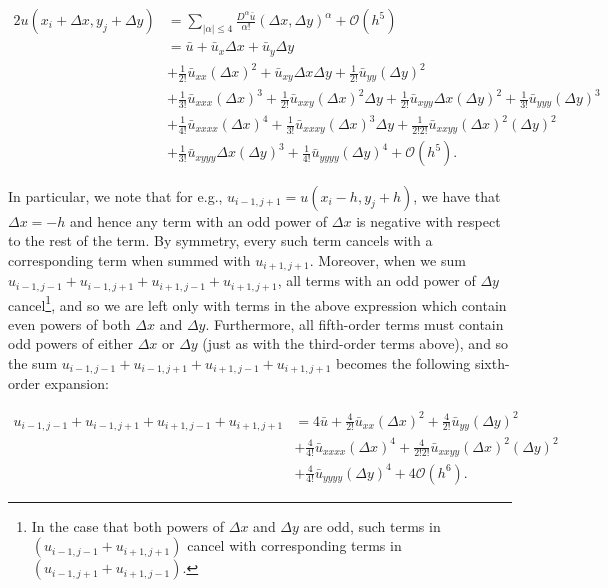 \begin{solution}
   \begin{alignat*}{2}
      u(x_i + \Delta x, y_j + \Delta y) &= \sum\limits_{|\alpha| \le 4}{\frac{D^{\alpha}\bar{u}}{\alpha!} (\Delta x, \Delta y)^\alpha} + \mathcal{O}(h^5) \\
                                        &= \bar{u} + \bar{u}_{x} \Delta x + \bar{u}_{y} \Delta y \\
                                        &+ \frac{1}{2!} \bar{u}_{xx}(\Delta x)^2 + \bar{u}_{xy} \Delta x \Delta y + \frac{1}{2!} \bar{u}_{yy}(\Delta y)^2 \\
                                        &+ \frac{1}{3!} \bar{u}_{xxx}(\Delta x)^3 + \frac{1}{2!} \bar{u}_{xxy} (\Delta x)^2 \Delta y + \frac{1}{2!} \bar{u}_{xyy} \Delta x (\Delta y)^2 + \frac{1}{3!} \bar{u}_{yyy}(\Delta y)^3 \\
                                        &+ \frac{1}{4!} \bar{u}_{xxxx}(\Delta x)^4 + \frac{1}{3!} \bar{u}_{xxxy} (\Delta x)^3 \Delta y + \frac{1}{2! 2!} \bar{u}_{xxyy} (\Delta x)^2 (\Delta y)^2  \\
                                        &+ \frac{1}{3!} \bar{u}_{xyyy} \Delta x (\Delta y)^3 + \frac{1}{4!} \bar{u}_{yyyy}(\Delta y)^4 + \mathcal{O}(h^5).
   \end{alignat*}

   In particular, we note that for e.g., $u_{i-1, j+1} = u(x_i - h, y_j + h)$, we have that $\Delta x = -h$ and hence
   any term with an odd power of $\Delta x$ is negative with respect to the rest of the term. By symmetry, every such 
   term cancels with a corresponding term when summed with $u_{i+1, j+1}$. Moreover, when we sum 
   $u_{i-1, j-1} + u_{i-1, j+1} + u_{i+1, j-1} + u_{i+1, j+1}$, all terms with an odd power of $\Delta y$ cancel\footnote{
      In the case that both powers of $\Delta x$ and $\Delta y$ are odd, such terms in $(u_{i-1, j-1} + u_{i+1, j+1})$
      cancel with corresponding terms in $(u_{i-1, j+1} + u_{i+1, j-1})$.
   }, and so we are left only with terms in the above expression which contain even powers of both $\Delta x$ and 
   $\Delta y$.  Furthermore, all fifth-order terms must contain odd powers of either $\Delta x$ or $\Delta y$ (just as
   with the third-order terms above), and so the sum 
   $u_{i-1, j-1} + u_{i-1, j+1} + u_{i+1, j-1} + u_{i+1, j+1}$ becomes the following sixth-order expansion:

   \begin{align*}
      u_{i-1, j-1} + u_{i-1, j+1} + u_{i+1, j-1} + u_{i+1, j+1} &= 4 \bar{u} + \frac{4}{2!} \bar{u}_{xx}(\Delta x)^2 + \frac{4}{2!} \bar{u}_{yy}(\Delta y)^2 \\
                                        &+ \frac{4}{4!} \bar{u}_{xxxx}(\Delta x)^4 + \frac{4}{2! 2!} \bar{u}_{xxyy} (\Delta x)^2 (\Delta y)^2  \\
                                        &+ \frac{4}{4!} \bar{u}_{yyyy}(\Delta y)^4 + 4 \mathcal{O}(h^6).
   \end{align*}


\end{solution}
